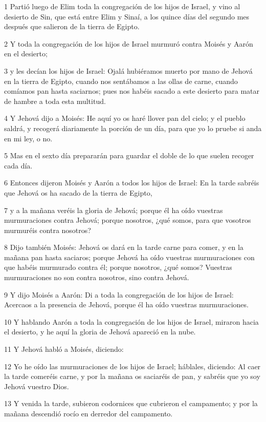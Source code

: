\par 1 Partió luego de Elim toda la congregación de los hijos de Israel, y vino al desierto de Sin, que está entre Elim y Sinaí, a los quince días del segundo mes después que salieron de la tierra de Egipto.
\par 2 Y toda la congregación de los hijos de Israel murmuró contra Moisés y Aarón en el desierto;
\par 3 y les decían los hijos de Israel: Ojalá hubiéramos muerto por mano de Jehová en la tierra de Egipto, cuando nos sentábamos a las ollas de carne, cuando comíamos pan hasta saciarnos; pues nos habéis sacado a este desierto para matar de hambre a toda esta multitud.
\par 4 Y Jehová dijo a Moisés: He aquí yo os haré llover pan del cielo; y el pueblo saldrá, y recogerá diariamente la porción de un día, para que yo lo pruebe si anda en mi ley, o no.
\par 5 Mas en el sexto día prepararán para guardar el doble de lo que suelen recoger cada día.
\par 6 Entonces dijeron Moisés y Aarón a todos los hijos de Israel: En la tarde sabréis que Jehová os ha sacado de la tierra de Egipto,
\par 7 y a la mañana veréis la gloria de Jehová; porque él ha oído vuestras murmuraciones contra Jehová; porque nosotros, ¿qué somos, para que vosotros murmuréis contra nosotros?
\par 8 Dijo también Moisés: Jehová os dará en la tarde carne para comer, y en la mañana pan hasta saciaros; porque Jehová ha oído vuestras murmuraciones con que habéis murmurado contra él; porque nosotros, ¿qué somos? Vuestras murmuraciones no son contra nosotros, sino contra Jehová.
\par 9 Y dijo Moisés a Aarón: Di a toda la congregación de los hijos de Israel: Acercaos a la presencia de Jehová, porque él ha oído vuestras murmuraciones.
\par 10 Y hablando Aarón a toda la congregación de los hijos de Israel, miraron hacia el desierto, y he aquí la gloria de Jehová apareció en la nube.
\par 11 Y Jehová habló a Moisés, diciendo:
\par 12 Yo he oído las murmuraciones de los hijos de Israel; háblales, diciendo: Al caer la tarde comeréis carne, y por la mañana os saciaréis de pan, y sabréis que yo soy Jehová vuestro Dios.
\par 13 Y venida la tarde, subieron codornices que cubrieron el campamento; y por la mañana descendió rocío en derredor del campamento.
